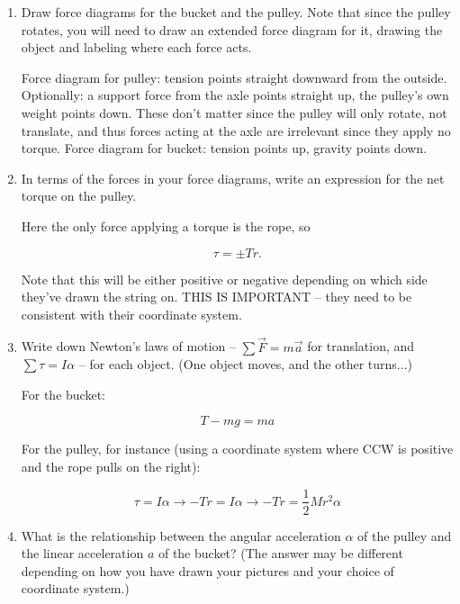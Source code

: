 \documentclass[12pt]{article}
\begin{document}
\begin{enumerate}

\item Draw force diagrams for the bucket and the pulley. Note that since the pulley rotates, you will need
to draw an extended force diagram for it, drawing the object and labeling where each force acts.


{\color{red}
Force diagram for pulley: tension points straight downward from the outside. Optionally: a support force from the axle points straight up, the pulley's own weight points down. These don't matter since the pulley will only rotate, not translate, and thus forces acting at the axle are irrelevant since they apply no torque. Force diagram for bucket: tension points up, gravity points down.}


\item In terms of the forces in your force diagrams, write an expression for the net torque on the pulley.


{\color{red}
Here the only force applying a torque is the rope, so

$$\tau = \pm Tr.$$

Note that this will be either positive or negative depending on which side they've drawn the string on. THIS IS IMPORTANT -- they need to be consistent with their coordinate system.

}
\vspace{1in}

\item Write down Newton's laws of motion -- $\sum \vec F = m \vec a$ for translation, and $\sum \tau = I \alpha$
-- for each object. (One object moves, and the other turns...)


{\color{red}
For the bucket:

$$T - mg = ma$$

For the pulley, for instance (using a coordinate system where CCW is positive and the rope pulls on the right):

$$\tau = I \alpha \rightarrow -Tr = I \alpha \rightarrow -Tr = \frac{1}{2}Mr^2 \alpha$$


}

\vspace{2in}


\newpage

\item What is the relationship between the angular acceleration $\alpha$ of the pulley and the linear acceleration
$a$ of the bucket? (The answer may be different depending on how you have drawn your pictures and your choice of
coordinate system.)



\end{enumerate}
\end{document}
